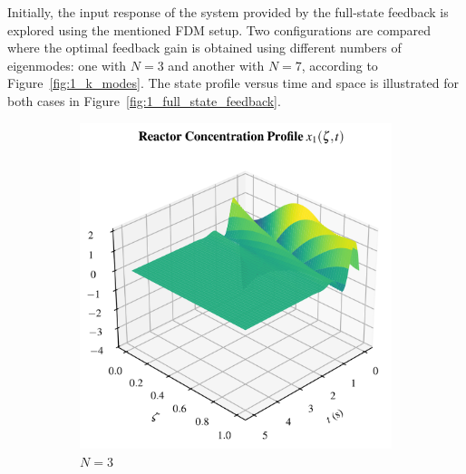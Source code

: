 Initially, the input response of the system provided by the full-state feedback is explored using the mentioned FDM setup. Two configurations are compared where the optimal feedback gain is obtained using different numbers of eigenmodes: one with $N=3$ and another with $N=7$, according to Figure~\ref{fig:1_k_modes}. The state profile versus time and space is illustrated for both cases in Figure~\ref{fig:1_full_state_feedback}. 

\begin{figure}[!htbp]
    \centering
    \begin{subfigure}[t]{0.49\textwidth}
        \includegraphics[width=\textwidth%
        ]{papers/1_optimal/figures/3D_x1_k3.png}
        \caption{$N=3$}
        \label{fig:1_3D_x1_k3}
    \end{subfigure}
    \hfill
    \begin{subfigure}[t]{0.49\textwidth}

\end{subfigure}
\end{figure}

